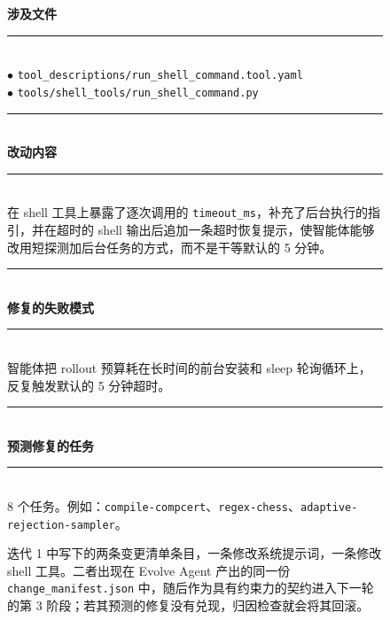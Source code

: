 \begin{figure}[t]
\begin{tcbraster}
\begin{tcolorbox}[colback=aheSky!18,colframe=aheNavy,colbacktitle=aheNavy,
                          title={\scriptsize\textbf{chg-1，迭代 1，commit \texttt{c0b8a05}，层级：提示词}}]
        \end{tcolorbox}
        \begin{tcolorbox}[colback=aheTeal!12,colframe=aheBlue,colbacktitle=aheBlue,
                          title={\scriptsize\textbf{chg-2，迭代 1，commit \texttt{169c34c}，层级：工具}}]
            \textbf{\textcolor{aheBlue}{涉及文件}} \\
            \rule{\linewidth}{0.3pt}\\[1pt]
            $\bullet$ \texttt{tool\_descriptions/run\_shell\_command.tool.yaml} \\
            $\bullet$ \texttt{tools/shell\_tools/run\_shell\_command.py} \\[3pt]
            \rule{\linewidth}{0.3pt}\\
            \textbf{\textcolor{aheBlue}{改动内容}} \\
            \rule{\linewidth}{0.3pt}\\[1pt]
            在 shell 工具上暴露了逐次调用的 \texttt{timeout\_ms}，补充了后台执行的指引，并在超时的 shell 输出后追加一条超时恢复提示，使智能体能够改用短探测加后台任务的方式，而不是干等默认的 5 分钟。 \\[3pt]
            \rule{\linewidth}{0.3pt}\\
            \textbf{\textcolor{aheBlue}{修复的失败模式}} \\
            \rule{\linewidth}{0.3pt}\\[1pt]
            智能体把 rollout 预算耗在长时间的前台安装和 sleep 轮询循环上，反复触发默认的 5 分钟超时。 \\[3pt]
            \rule{\linewidth}{0.3pt}\\
            \textbf{\textcolor{aheBlue}{预测修复的任务}} \\
            \rule{\linewidth}{0.3pt}\\[1pt]
            8 个任务。例如：\texttt{compile-compcert}、\texttt{regex-chess}、\texttt{adaptive-rejection-sampler}。
        \end{tcolorbox}
    \end{tcbraster}
    \caption{迭代 1 中写下的两条变更清单条目，一条修改系统提示词，一条修改 shell 工具。二者出现在 Evolve Agent 产出的同一份 \texttt{change\_manifest.json} 中，随后作为具有约束力的契约进入下一轮的第 3 阶段；若其预测的修复没有兑现，归因检查就会将其回滚。}
    \label{fig:manifest-prompt-tool}
\end{figure}
